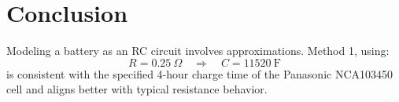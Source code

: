 \documentclass[]{article}
\begin{document}
	\section*{Conclusion}
	
	Modeling a battery as an RC circuit involves approximations. Method 1, using:
	\begin{equation*}
		R = 0.25\ \Omega \quad \Rightarrow \quad C = 11520\ \text{F}
	\end{equation*}
	is consistent with the specified 4-hour charge time of the Panasonic NCA103450 cell and aligns better with typical resistance behavior.
	
\end{document}
